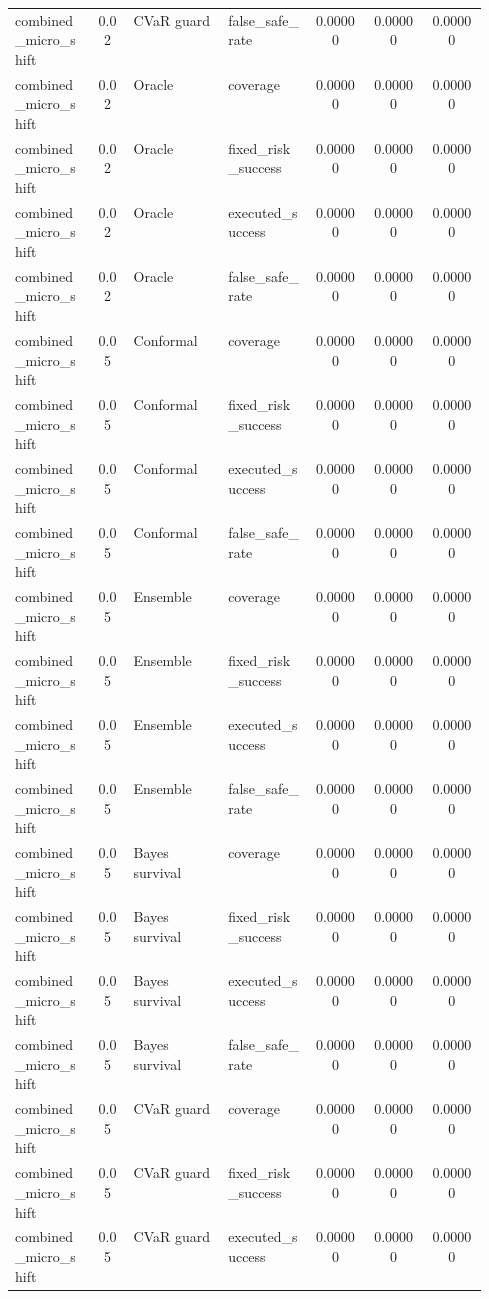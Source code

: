 \documentclass{article}
\begin{document}
\begin{center}
\begin{longtable}{p{0.17\linewidth}cp{0.20\linewidth}p{0.18\linewidth}ccc}
combined\_micro\_shift & 0.02 & CVaR guard & false\_safe\_rate & 0.00000 & 0.00000 & 0.00000\\
combined\_micro\_shift & 0.02 & Oracle & coverage & 0.00000 & 0.00000 & 0.00000\\
combined\_micro\_shift & 0.02 & Oracle & fixed\_risk\_success & 0.00000 & 0.00000 & 0.00000\\
combined\_micro\_shift & 0.02 & Oracle & executed\_success & 0.00000 & 0.00000 & 0.00000\\
combined\_micro\_shift & 0.02 & Oracle & false\_safe\_rate & 0.00000 & 0.00000 & 0.00000\\
combined\_micro\_shift & 0.05 & Conformal & coverage & 0.00000 & 0.00000 & 0.00000\\
combined\_micro\_shift & 0.05 & Conformal & fixed\_risk\_success & 0.00000 & 0.00000 & 0.00000\\
combined\_micro\_shift & 0.05 & Conformal & executed\_success & 0.00000 & 0.00000 & 0.00000\\
combined\_micro\_shift & 0.05 & Conformal & false\_safe\_rate & 0.00000 & 0.00000 & 0.00000\\
combined\_micro\_shift & 0.05 & Ensemble & coverage & 0.00000 & 0.00000 & 0.00000\\
combined\_micro\_shift & 0.05 & Ensemble & fixed\_risk\_success & 0.00000 & 0.00000 & 0.00000\\
combined\_micro\_shift & 0.05 & Ensemble & executed\_success & 0.00000 & 0.00000 & 0.00000\\
combined\_micro\_shift & 0.05 & Ensemble & false\_safe\_rate & 0.00000 & 0.00000 & 0.00000\\
combined\_micro\_shift & 0.05 & Bayes survival & coverage & 0.00000 & 0.00000 & 0.00000\\
combined\_micro\_shift & 0.05 & Bayes survival & fixed\_risk\_success & 0.00000 & 0.00000 & 0.00000\\
combined\_micro\_shift & 0.05 & Bayes survival & executed\_success & 0.00000 & 0.00000 & 0.00000\\
combined\_micro\_shift & 0.05 & Bayes survival & false\_safe\_rate & 0.00000 & 0.00000 & 0.00000\\
combined\_micro\_shift & 0.05 & CVaR guard & coverage & 0.00000 & 0.00000 & 0.00000\\
combined\_micro\_shift & 0.05 & CVaR guard & fixed\_risk\_success & 0.00000 & 0.00000 & 0.00000\\
combined\_micro\_shift & 0.05 & CVaR guard & executed\_success & 0.00000 & 0.00000 & 0.00000\\

\end{longtable}
\end{center}
\end{document}
